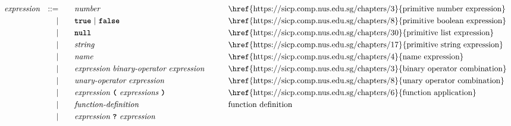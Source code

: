 \begin{alignat*}{9}
&& \textit{expression}   && ::= &\quad &&  \textit{number}   && \textrm{\href{https://sicp.comp.nus.edu.sg/chapters/3}{primitive number expression}}\\
&&                       && |   &\quad && \textbf{\texttt{true}}\ |\ \textbf{\texttt{false}}
                                                           && \textrm{\href{https://sicp.comp.nus.edu.sg/chapters/8}{primitive boolean expression}}\\
&&                       && |   &\quad && \textbf{\texttt{null}}
                                                           && \textrm{\href{https://sicp.comp.nus.edu.sg/chapters/30}{primitive list expression}} \\
&&                       && |   &\quad &&  \textit{string}   && \textrm{\href{https://sicp.comp.nus.edu.sg/chapters/17}{primitive string expression}} \\
&&                       && |   &\quad &&  \textit{name}   && \textrm{\href{https://sicp.comp.nus.edu.sg/chapters/4}{name expression}} \\
&&                       && |   &\quad &&  \textit{expression} \  \textit{binary-operator} \ 
                                            \textit{expression} \qquad
                                                           && \textrm{\href{https://sicp.comp.nus.edu.sg/chapters/3}{binary operator combination}} \\
&&                       && |   &\quad &&   \textit{unary-operator} \ 
                                            \textit{expression}
                                                           && \textrm{\href{https://sicp.comp.nus.edu.sg/chapters/8}{unary operator combination}}\\
&&                       && |   &\quad &&   \textit{expression} \ 
                                            \textbf{\texttt{(}}\ \textit{expressions}\
                                            \textbf{\texttt{)}}
                                                           && \textrm{\href{https://sicp.comp.nus.edu.sg/chapters/6}{function application}} \\
&&                       && |   &\quad &&   \textit{function-definition}
														   && \textrm{function definition}\\                                              
&&                       && |   &\quad &&   \textit{expression} \ \textbf{\texttt{?}}\ 
                                            \textit{expression}

\end{alignat*}
